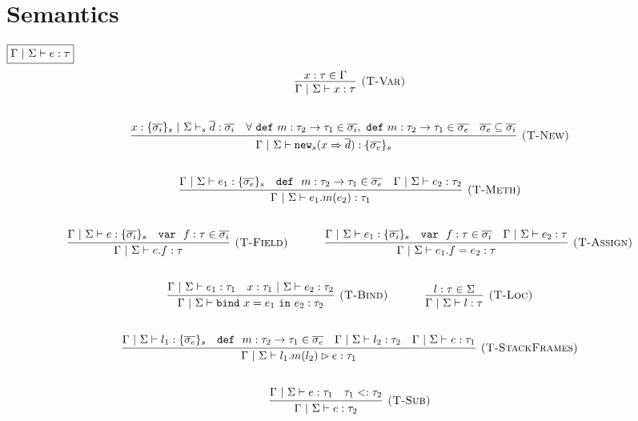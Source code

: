 \documentclass{llncs}
\newcommand{\keywadj}[1]{\mathtt{#1}}
\newcommand{\keyw}[1]{\keywadj{#1}~}
\begin{document}
\newpage

\section{Semantics}

$\fbox{$\Gamma~|~\Sigma \vdash e : \tau$}$
\[
\begin{array}{c}
\infer[\textsc{(T-Var)}]
  {\Gamma~|~\Sigma \vdash x : \tau}
  {x : \tau \in \Gamma}\\[5ex]
\infer[\textsc{(T-New)}]
	{\Gamma~|~\Sigma \vdash \keywadj{new}_{s}(x \Rightarrow \overline{d}) : \{ \overline{\sigma_e} \}_{s}}
	{x : \{ \overline{\sigma_i} \}_{s}~|~\Sigma \vdash_s \overline{d} : \overline{\sigma_i} & \forall~\keyw{def} m : \tau_2 \rightarrow \tau_1 \in \overline{\sigma_i},~\keyw{def} m : \tau_2 \rightarrow \tau_1 \in \overline{\sigma_e} & \overline{\sigma_e} \subseteq \overline{\sigma_i}} \\[5ex]

\infer[\textsc{(T-Meth)}]
	{\Gamma~|~\Sigma \vdash e_1.m(e_2) : \tau_1} 
	{\Gamma~|~\Sigma \vdash e_1 : \{ \overline{\sigma_e} \}_s  & \keyw{def}~ m : \tau_2 \rightarrow \tau_1 \in \overline{\sigma_e} & \Gamma~|~\Sigma \vdash e_2 : \tau_2}\\[5ex]

\infer[\textsc{(T-Field)}]
	{\Gamma~|~\Sigma \vdash  e.f : \tau} 
	{\Gamma~|~\Sigma \vdash e : \{ \overline{\sigma_i} \}_s & \keyw{var}~ f : \tau \in \overline{\sigma_i}}%
~~~~~~~~~~
\infer[\textsc{(T-Assign)}]
	{\Gamma~|~\Sigma \vdash  e_1.f=e_2 : \tau} 
	{\Gamma~|~\Sigma \vdash e_1 : \{ \overline{\sigma_i} \}_s & \keyw{var}~ f : \tau \in \overline{\sigma_i} & \Gamma~|~\Sigma \vdash e_2 : \tau}\\[5ex]

\infer[\textsc{(T-Bind)}]
  {\Gamma~|~\Sigma \vdash \keyw{bind} x = e_1~\keyw{in} e_2 : \tau_2}
  {\Gamma~|~\Sigma \vdash e_1 : \tau_1 & x : \tau_1~|~\Sigma \vdash e_2 : \tau_2}%
~~~~~~~~~~
\infer[\textsc{(T-Loc)}]
  {\Gamma~|~\Sigma \vdash l : \tau}
  {l : \tau \in \Sigma}\\[5ex]

\infer[\textsc{(T-StackFrames)}]
	{\Gamma~|~\Sigma \vdash l_1.m(l_2) \rhd e : \tau_1}
	{\Gamma~|~\Sigma \vdash l_1 : \{ \overline{\sigma_e} \}_s & \keyw{def}~ m : \tau_2 \rightarrow \tau_1 \in \overline{\sigma_e} & \Gamma~|~\Sigma \vdash l_2 : \tau_2 & \Gamma~|~\Sigma \vdash e : \tau_1} \\[5ex]

\infer[\textsc{(T-Sub)}]
  {\Gamma~|~\Sigma \vdash e : \tau_2}
  {\Gamma~|~\Sigma \vdash e : \tau_1 & \tau_1 <: \tau_2}\\[5ex]

\end{array}
\]
\end{document}
